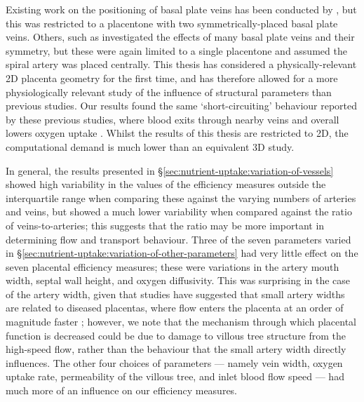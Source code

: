         Existing work on the positioning of basal plate veins has been conducted by \citeauthor{chernyavskyMathematicalModelIntervillous2010} \cite{chernyavskyMathematicalModelIntervillous2010}, but this was restricted to a placentone with two symmetrically-placed basal plate veins. Others, such as \citeauthor{meklerImpactTissuePorosity2022} \cite{meklerImpactTissuePorosity2022} investigated the effects of many basal plate veins and their symmetry, but these were again limited to a single placentone and assumed the spiral artery was placed centrally. This thesis has considered a physically-relevant 2D placenta geometry for the first time, and has therefore allowed for a more physiologically relevant study of the influence of structural parameters than previous studies. Our results found the same `short-circuiting' behaviour reported by these previous studies, where blood exits through nearby veins and overall lowers oxygen uptake \cite{chernyavskyMathematicalModelIntervillous2010,meklerImpactTissuePorosity2022}. Whilst the results of this thesis are restricted to 2D, the computational demand is much lower than an equivalent 3D study.

        In general, the results presented in \S\ref{sec:nutrient-uptake:variation-of-vessels} showed high variability in the values of the efficiency measures outside the interquartile range when comparing these against the varying numbers of arteries and veins, but showed a much lower variability when compared against the ratio of veins-to-arteries; this suggests that the ratio may be more important in determining flow and transport behaviour. Three of the seven parameters varied in \S\ref{sec:nutrient-uptake:variation-of-other-parameters} had very little effect on the seven placental efficiency measures; these were variations in the artery mouth width, septal wall height, and oxygen diffusivity. This was surprising in the case of the artery width, given that studies have suggested that small artery widths are related to diseased placentas, where flow enters the placenta at an order of magnitude faster \cite{burtonRheologicalPhysiologicalConsequences2009}; however, we note that the mechanism through which placental function is decreased could be due to damage to villous tree structure from the high-speed flow, rather than the behaviour that the small artery width directly influences. The other four choices of parameters --- namely vein width, oxygen uptake rate, permeability of the villous tree, and inlet blood flow speed --- had much more of an influence on our efficiency measures.

